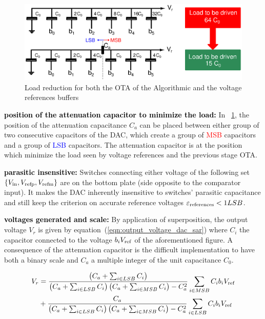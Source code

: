 \begin{figure}[htp]
	\centering
	\includegraphics[width=\textwidth]{Chapter4/Figs/sar-dac-normal-split-cap.ps}
	\caption{Load reduction for both the OTA of the Algorithmic and the voltage references buffers}
	\label{fig:sar-dac-normal-split-cap}
\end{figure}
\textbf{\textcolor{black}{position of the attenuation capacitor to minimize the load:}}
In \figurename~\ref{fig:sar-dac-normal-split-cap}, the position of the attenuation capacitance \(C_a\) can be placed between either group of two consecutive capacitors of the DAC, which create a group of \textcolor{red}{MSB} capacitors and a group of \textcolor{blue}{LSB} capacitors. The attenuation capacitor is at the position which minimize the load seen by voltage references and the previous stage OTA\@.

\textbf{\textcolor{black}{parasitic insensitive:}}
Switches connecting either voltage of the following set \(\left\{ V_{\rm in}, V_{\rm refp}, V_{\rm refm} \right\} \) are on the bottom plate (side opposite to the comparator input). It makes the DAC inherently insensitive to switches' parasitic capacitance and still keep the criterion on accurate reference voltages \(\varepsilon_{\rm references} < 1 LSB\).

\textbf{\textcolor{black}{voltages generated and scale:}}
By application of superposition, the output voltage \(V_r\) is given by equation~(\ref{eqn:output_voltage_dac_sar}) where \(C_i\) the capacitor connected to the voltage \(b_i V_{\rm ref}\) of the aforementioned figure. A consequence of the attenuation capacitor is the difficult implementation to have both a binary scale and \(C_a\) a multiple integer of the unit capacitance \(C_0\).

\begin{align}
	\label{eqn:output_voltage_dac_sar}
	V_r &= \frac{\left(C_a + \sum_{i \in LSB}{C_i}\right)}{\left(C_a + \sum_{i \in LSB}{C_i}\right)\left(C_a + \sum_{i \in MSB}{C_i}\right)-C_a^2} \sum_{i \in MSB}{C_i b_i} V_{\rm ref} \nonumber \\
	&+ \frac{C_a}{\left(C_a + \sum_{i \in LSB}{C_i}\right)\left(C_a + \sum_{i \in MSB}{C_i}\right)-C_a^2} \sum_{i \in LSB}{C_i b_i} V_{\rm ref}
\end{align}

